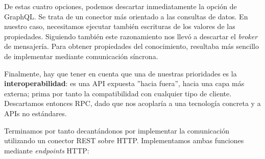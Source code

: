 De estas cuatro opciones, podemos descartar inmediatamente la opción de GraphQL. Se trata de un conector más orientado a las consultas de datos. En nuestro caso, necesitamos ejecutar también escrituras de los valores de las propiedades. Siguiendo también este razonamiento nos llevó a descartar el \textit{broker} de mensajería. Para obtener propiedades del conocimiento, resultaba más sencillo de implementar mediante comunicación síncrona.

Finalmente, hay que tener en cuenta que una de nuestras prioridades es la \textbf{interoperabilidad}: es una API expuesta ''hacia fuera'', hacia una capa más externa; prima por tanto la compatibilidad con cualquier tipo de cliente. Descartamos entonces RPC, dado que nos acoplaría a una tecnología concreta y a APIs no estándares.

Terminamos por tanto decantándonos por implementar la comunicación utilizando un conector REST sobre HTTP. Implementamos ambas funciones mediante \textit{endpoints} HTTP:

